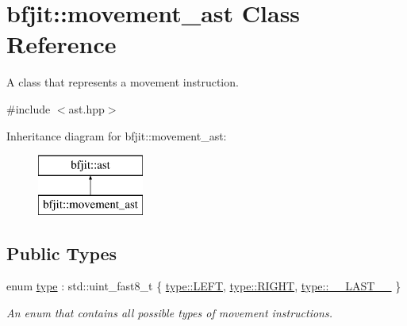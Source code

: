 \hypertarget{classbfjit_1_1movement__ast}{}\section{bfjit\+:\+:movement\+\_\+ast Class Reference}
\label{classbfjit_1_1movement__ast}


A class that represents a movement instruction.  




{\ttfamily \#include $<$ast.\+hpp$>$}

Inheritance diagram for bfjit\+:\+:movement\+\_\+ast\+:\begin{figure}[H]
\begin{center}
\leavevmode
\includegraphics[height=2.000000cm]{classbfjit_1_1movement__ast}
\end{center}
\end{figure}
\subsection*{Public Types}
\begin{DoxyCompactItemize}
\item 
enum \hyperlink{classbfjit_1_1movement__ast_a3aa723a03d76c31e1e88be817670701f}{type} \+: std\+::uint\+\_\+fast8\+\_\+t \{ \hyperlink{classbfjit_1_1movement__ast_a3aa723a03d76c31e1e88be817670701fa684d325a7303f52e64011467ff5c5758}{type\+::\+L\+E\+FT}, 
\hyperlink{classbfjit_1_1movement__ast_a3aa723a03d76c31e1e88be817670701fa21507b40c80068eda19865706fdc2403}{type\+::\+R\+I\+G\+HT}, 
\hyperlink{classbfjit_1_1movement__ast_a3aa723a03d76c31e1e88be817670701fa62bd5a4afef994ba01e631cbf00f85be}{type\+::\+\_\+\+\_\+\+L\+A\+S\+T\+\_\+\+\_\+}
 \}\begin{DoxyCompactList}\small\item\em An enum that contains all possible types of movement instructions. \end{DoxyCompactList}
\end{DoxyCompactItemize}

